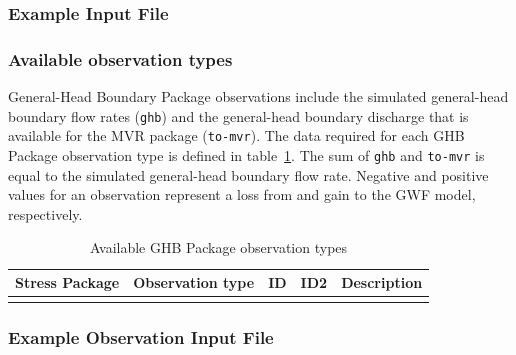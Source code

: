 \vspace{5mm}
\subsubsection{Example Input File}


\vspace{5mm}
\subsubsection{Available observation types}
General-Head Boundary Package observations include the simulated general-head boundary flow rates (\texttt{ghb}) and the general-head boundary discharge that is available for the MVR package (\texttt{to-mvr}). The data required for each GHB Package observation type is defined in table~\ref{table:gwf-ghbobstype}. The sum of \texttt{ghb} and \texttt{to-mvr} is equal to the simulated general-head boundary flow rate. Negative and positive values for an observation represent a loss from and gain to the GWF model, respectively.

\begin{longtable}{p{2cm} p{2.75cm} p{2cm} p{1.25cm} p{7cm}}
\caption{Available GHB Package observation types} \tabularnewline

\hline
\hline
\textbf{Stress Package} & \textbf{Observation type} & \textbf{ID} & \textbf{ID2} & \textbf{Description} \\
\hline
\endhead

\hline
\endfoot


\label{table:gwf-ghbobstype}
\end{longtable}

\vspace{5mm}
\subsubsection{Example Observation Input File}

